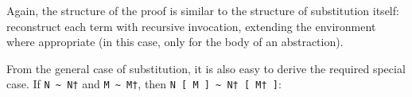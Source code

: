 Again, the structure of the proof is similar to the structure of
substitution itself: reconstruct each term with recursive invocation,
extending the environment where appropriate (in this case, only for the
body of an abstraction).

From the general case of substitution, it is also easy to derive the
required special case. If \texttt{N\ \textasciitilde{}\ N†} and
\texttt{M\ \textasciitilde{}\ M†}, then
\texttt{N\ {[}\ M\ {]}\ \textasciitilde{}\ N†\ {[}\ M†\ {]}}:

\begin{fence}
\begin{code}%
\>[0]\AgdaSpace{}%
\AgdaSymbol{:}\AgdaSpace{}%
\AgdaSpace{}%
\AgdaSymbol{\{}\AgdaSpace{}%
\AgdaSpace{}%
\AgdaSymbol{\}}\AgdaSpace{}%
\AgdaSymbol{\{}\AgdaSpace{}%
\AgdaSpace{}%
\AgdaSymbol{:}\AgdaSpace{}%
\AgdaSpace{}%
\AgdaOperator{\AgdaInductiveConstructor{,}}\AgdaSpace{}%
\AgdaSpace{}%
\AgdaSpace{}%
\AgdaSymbol{\}}\AgdaSpace{}%
\AgdaSymbol{\{}\AgdaSpace{}%
\AgdaSpace{}%
\AgdaSymbol{:}\AgdaSpace{}%
\AgdaSpace{}%
\AgdaSpace{}%
\AgdaSymbol{\}}\<%
\\
\>[0][@{}l@{\AgdaIndent{0}}]%
\>[2]\AgdaSpace{}%
\AgdaSpace{}%
\AgdaOperator{\AgdaDatatype{\textasciitilde{}}}\AgdaSpace{}%
\<%
\\
%
\>[2]%
\>[401I]\AgdaSpace{}%
\AgdaOperator{\AgdaDatatype{\textasciitilde{}}}\AgdaSpace{}%
\<%
\\
\>[.][@{}l@{}]\<[401I]%
\>[4]\AgdaComment{-----------------------}\<%
\\
%
\>[2]\AgdaSpace{}%
\AgdaSymbol{(}\AgdaSpace{}%
\AgdaOperator{\AgdaFunction{[}}\AgdaSpace{}%
\AgdaSpace{}%
\AgdaOperator{\AgdaFunction{]}}\AgdaSymbol{)}\AgdaSpace{}%
\AgdaOperator{\AgdaDatatype{\textasciitilde{}}}\AgdaSpace{}%
\AgdaSymbol{(}\AgdaSpace{}%
\AgdaOperator{\AgdaFunction{[}}\AgdaSpace{}%
\AgdaSpace{}%
\AgdaOperator{\AgdaFunction{]}}\AgdaSymbol{)}\<%
\\
\>[0]\AgdaSpace{}%
\AgdaSymbol{\{}\AgdaSymbol{\}}\AgdaSpace{}%
\AgdaSymbol{\{}\AgdaSymbol{\}}\AgdaSpace{}%
\AgdaSymbol{\{}\AgdaSymbol{\}}\AgdaSpace{}%

\end{code}
\end{fence}
